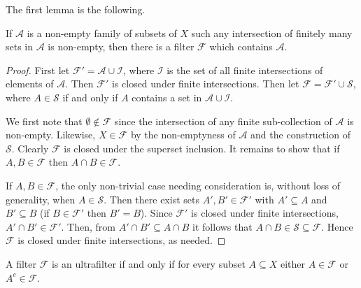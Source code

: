 The first lemma is the following.
\begin{lemma}
\label{filter:1}
If \( \mathcal{A}  \) is a non-empty family of subsets of \( X \) such any intersection of finitely many sets in \( \mathcal{A}   \) is non-empty, then there is a filter \( \mathcal{F}  \) which contains \( \mathcal{A} \).
\end{lemma}
\begin{proof}
First let \( \mathcal{F}' =  \mathcal{A} \cup \mathcal{I} \), where \( \mathcal{I} \) is the set of all finite intersections of elements of \( \mathcal{A}   \). Then \( \mathcal{F'}  \) is closed under finite intersections. Then let \( \mathcal{F} = \mathcal{F}' \cup \mathcal{S}  \), where \( A \in \mathcal{S}  \) if and only if \( A \) contains a set in \( \mathcal{A} \cup \mathcal{I}  \).

We first note that \( \emptyset \notin \mathcal{F} \) since the intersection of any finite sub-collection of \(\mathcal{A}   \) is non-empty. Likewise, \( X \in \mathcal{F}  \) by the non-emptyness of \( \mathcal{A}  \) and the construction of \( \mathcal{S}  \). Clearly \( \mathcal{F}  \) is closed under the superset inclusion. It remains to show that if \( A, B \in \mathcal{F}  \) then \( A \cap B \in \mathcal{F}  \). 

If \( A, B \in \mathcal{F}  \), the only non-trivial case needing consideration is, without loss of generality, when \( A \in \mathcal{S}  \). Then there exist sets \( A', B' \in \mathcal{F}' \) with \( A' \subseteq A \) and \( B' \subseteq B \) (if \( B \in \mathcal{F}' \) then \( B' = B \)). Since \( \mathcal{F} ' \) is closed under finite intersections, \( A' \cap B' \in \mathcal{F} ' \). Then, from \( A' \cap B' \subseteq A \cap B \) it follows that \( A \cap B \in \mathcal{S} \subseteq \mathcal{F}  \). Hence \( \mathcal{F}  \) is closed under finite intersections, as needed.
\end{proof}
\begin{lemma}
\label{filter:2}
A filter \( \mathcal{F}  \) is an ultrafilter if and only if for every subset \( A \subseteq X \) either \( A \in \mathcal{F}  \) or \( A^{c} \in \mathcal{F}  \).
\end{lemma}
